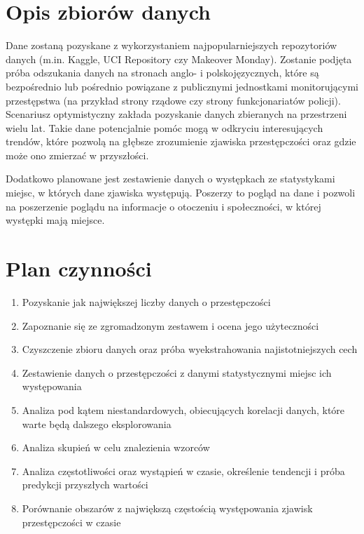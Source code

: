 \documentclass[a4paper,11pt]{article}
\begin{document}
\section{Opis zbiorów danych} \label{sec:dataset}

Dane zostaną pozyskane z wykorzystaniem najpopularniejszych repozytoriów danych (m.in. Kaggle, UCI Repository czy Makeover Monday). Zostanie podjęta próba odszukania danych na stronach anglo- i polskojęzycznych, które są bezpośrednio lub pośrednio powiązane z publicznymi jednostkami monitorującymi przestępstwa (na przykład strony rządowe czy strony 
funkcjonariatów policji). Scenariusz optymistyczny zakłada pozyskanie danych zbieranych na przestrzeni wielu lat. Takie dane potencjalnie pomóc mogą w odkryciu interesujących trendów, które pozwolą na głębsze zrozumienie zjawiska przestępczości oraz gdzie może ono zmierzać w przyszłości.
\par
Dodatkowo planowane jest zestawienie danych o występkach ze statystykami miejsc, w których dane zjawiska występują. Poszerzy to pogląd na dane i pozwoli na poszerzenie poglądu na informacje o otoczeniu i społeczności, w której występki mają miejsce.


\section{Plan czynności}

\begin{enumerate}
    \item Pozyskanie jak największej liczby danych o przestępczości
    \item Zapoznanie się ze zgromadzonym zestawem i ocena jego użyteczności
    \item Czyszczenie zbioru danych oraz próba wyekstrahowania najistotniejszych cech
    \item Zestawienie danych o przestępczości z danymi statystycznymi miejsc ich występowania
    \item Analiza pod kątem niestandardowych, obiecujących korelacji danych, które warte będą dalszego eksplorowania
    \item Analiza skupień w celu znalezienia wzorców
    \item Analiza częstotliwości oraz wystąpień w czasie, określenie tendencji i próba predykcji przyszłych wartości
    \item Porównanie obszarów z największą częstością występowania zjawisk przestępczości w czasie
\end{enumerate}
\end{document}
